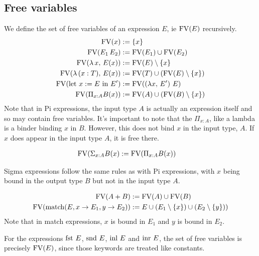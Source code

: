\documentclass{article}
\begin{document}
\subsection{Free variables}
We define the set of free variables of an expression $E$, ie $\operatorname{FV}(E)$ recursively.
\begin{align*}
  \operatorname{FV} (x) &:= \{x\} \\
  \operatorname{FV} (E_1 \, E_2) &:= \operatorname{FV}(E_1) \cup \operatorname{FV}(E_2) \\
  \operatorname{FV} (\lambda \, x, \, E(x)) &:= \operatorname{FV}(E) \setminus \{x\} \\
  \operatorname{FV} (\lambda \, (x : T), \, E(x)) &:= \operatorname{FV}(T) \cup (\operatorname{FV}(E) \setminus \{x\}) \\
  \operatorname{FV} (\text{let } x := E \text{ in } E') &:= \operatorname{FV}((\lambda x, \, E') \,\, E) \\
  \operatorname{FV} (\Pi_{x : A} B(x)) &:= \operatorname{FV}(A) \cup (\operatorname{FV}(B) \setminus \{x\})
\end{align*}
Note that in Pi expressions, the input type $A$ is actually an expression itself
and so may contain free variables. It's important to note that the $\Pi_{x :
  A}$, like a lambda is a binder binding $x$ in $B$. However, this does not bind
$x$ in the input type, $A$. If $x$ does appear in the input type $A$, it is
free there.

\begin{align*}
 \operatorname{FV} (\Sigma_{x : A} B(x) &:= \operatorname{FV}(\Pi_{x : A} B(x))
\end{align*}

Sigma expressions follow the same rules as with Pi expressions, with $x$ being
bound in the output type $B$ but not in the input type $A$.

\begin{align*}
  \operatorname{FV} (A + B) &:= \operatorname{FV}(A) \cup \operatorname{FV}(B) \\
  \operatorname{FV} (\operatorname{match}(E, x \rightarrow E_1, y \rightarrow E_2)) &:= 
    E \cup (E_1 \setminus \{x\}) \cup (E_2 \setminus \{y\}))
\end{align*}
Note that in match expressions, $x$ is bound in $E_1$ and $y$ is bound in $E_2$.

For the expressions $\operatorname{fst} \, E$, $\operatorname{snd} \, E$, $\operatorname{inl} \, E$ and $\operatorname{inr} \, E$, the
set of free variables is precisely $\operatorname{FV}(E)$, since those keywords are treated
like constants.
\end{document}
